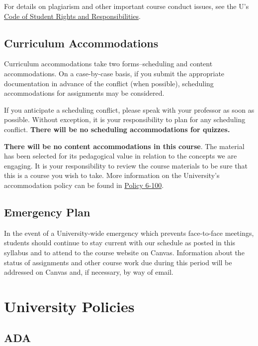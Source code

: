 \documentclass[
  letterpaper,
]{article}
\begin{document}
For details on plagiarism and other important course conduct issues, see
the U's \href{http://regulations.utah.edu/academics/6-400.php}{Code of
Student Rights and Responsibilities}.

\subsection{Curriculum Accommodations}\label{curriculum-accommodations}

Curriculum accommodations take two forms--scheduling and content
accommodations. On a case-by-case basis, if you submit the appropriate
documentation in advance of the conflict (when possible), scheduling
accommodations for assignments may be considered.

If you anticipate a scheduling conflict, please speak with your
professor as soon as possible. Without exception, it is your
responsibility to plan for any scheduling conflict. \textbf{There will
be no scheduling accommodations for quizzes.}

\textbf{There will be no content accommodations in this course}. The
material has been selected for its pedagogical value in relation to the
concepts we are engaging. It is your responsibility to review the course
materials to be sure that this is a course you wish to take. More
information on the University's accommodation policy can be found in
\href{https://regulations.utah.edu/academics/6-100.php}{Policy 6-100}.

\subsection{Emergency Plan}\label{emergency-plan}

In the event of a University-wide emergency which prevents face-to-face
meetings, students should continue to stay current with our schedule as
posted in this syllabus and to attend to the course website on Canvas.
Information about the status of assignments and other course work due
during this period will be addressed on Canvas and, if necessary, by way
of email.

\section{University Policies}\label{sec-Upolicies}

\subsection{ADA}\label{ada}
\end{document}
